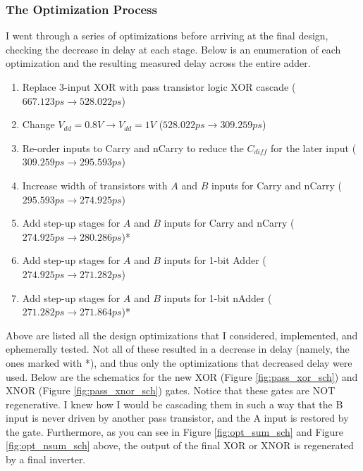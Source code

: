 \documentclass{article}
\begin{document}
\subsubsection{The Optimization Process}
I went through a series of optimizations before arriving at the final design, checking the decrease in delay at each stage. Below is an enumeration of each optimization and the resulting measured delay across the entire adder.
\begin{enumerate}
\item Replace 3-input XOR with pass transistor logic XOR cascade ($667.123ps \rightarrow 528.022ps$)
\item Change $V_{dd} = 0.8V \rightarrow V_{dd} = 1V$ ($528.022ps \rightarrow 309.259ps$)
\item Re-order inputs to Carry and nCarry to reduce the $C_{diff}$ for the later input ($309.259ps \rightarrow 295.593ps$)
\item Increase width of transistors with $A$ and $B$ inputs for Carry and nCarry  ($295.593ps \rightarrow 274.925ps$)
\item Add step-up stages for $A$ and $B$ inputs for Carry and nCarry  ($274.925ps \rightarrow 280.286ps$)*
\item Add step-up stages for $A$ and $B$ inputs for 1-bit Adder  ($274.925ps \rightarrow 271.282ps$)
\item Add step-up stages for $A$ and $B$ inputs for 1-bit nAdder  ($271.282ps \rightarrow 271.864ps$)*
\end{enumerate}
Above are listed all the design optimizations that I considered, implemented, and ephemerally tested. Not all of these resulted in a decrease in delay (namely, the ones marked with *), and thus only the optimizations that decreased delay were used. Below are the schematics for the new XOR (Figure \ref{fig:pass_xor_sch}) and XNOR (Figure \ref{fig:pass_xnor_sch}) gates. Notice that these gates are NOT regenerative. I knew how I would be cascading them in such a way that the B input is never driven by another pass transistor, and the A input is restored by the gate. Furthermore, as you can see in Figure \ref{fig:opt_sum_sch} and Figure \ref{fig:opt_nsum_sch} above, the output of the final XOR or XNOR is regenerated by a final inverter. 
\end{document}
